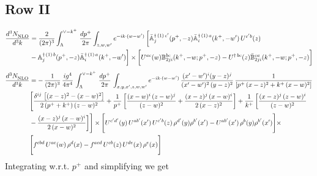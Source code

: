 \documentclass[9pt]{article}
\def\mf#1{\mathbb{#1}}
\numberwithin{equation}{section}
\begin{document}
\subsection{Row II\,}
\begin{align}
    \frac{d^{3}N_{\rm NLO}^{\rm}}{d^{3}k}  & =    \frac{2}{(2\pi)^{3}} \int_{\Lambda}^{\vee-k^{+}}\, \frac{dp^{+}}{2\pi}\int_{z,w,w^{\prime}} e^{-ik\cdot (w-w')}\,\bigg[\Bar{\mf{A}}^{\dagger\,(1)\, c^{\prime}}_{j}(p^{+},-z)\Bar{\mf{A}}^{\dagger\, (1)\, a}_{i}(k^{+},-w^{\prime})\,U^{c^{\prime}b}(z)\notag \\ & - \mf{A}^{\dagger\, (1)\, b}_{j}(p^{+},- z)\Bar{\mf{A}}^{\dagger\, (1)\, a}_{i}(k^{+},- w^{\prime})\bigg] \times  \bigg[U^{ac}(w) \mf{B}^{bc}_{2ji}(k^{+},-w;p^{+},-z) -U^{\dagger\, bc}(z)\Bar{\mf{B}}^{ca}_{2ji}(k^{+},-w; p^{+},-z)\bigg] \nonumber
\end{align} 
\begin{align}
    \frac{d^{3}N_{\rm NLO}^{\rm}}{d^{3}k}  & =  -\,\frac{1}{(2\pi)^{3}}\,\frac{ig^{4}}{4\pi^{4}}\,\int_{\Lambda}^{\vee-k^{+}}\,\frac{dp^{+}}{2\pi}\, \int_{x,y,x',z,w,w^{\prime}} e^{-ik\cdot (w-w')}\, \frac{(x'-w')^{i}(y-z)^{j}}{(x'-w')^{2}\,(y-z)^{2}}\, \frac{1}{\left[p^{+}\,(x-z)^{2}+k^{+}\,(x-w)^{2}\right]}\notag \\ & \Bigg[\frac{\delta^{ij}\, \left[(x-z)^{2}-(x-w)^{2}\right]}{2\, (p^{+}+k^{+})\,(z-w)^{2}}+\frac{1}{p^{+}}\, \bigg[\frac{(x-w)^{i}\,(z-w)^{j}}{(z-w)^{2}}+\frac{(x-z)^{j}\,(x-w)^{i}}{2\,(x-z)^{2}}\bigg]+\frac{1}{k^{+}}\,\bigg[\frac{(x-z)^{j}\,(z-w)^{i}}{(z-w)^{2}}\notag \\ & -\frac{(x-z)^{j}\,(x-w)^{i}}{2\,(x-w)^{2}}\bigg]\Bigg]\times \Bigg[U^{c'd'}(y)\,U^{ab'}(x')\,U^{c'b}(z)\,\rho^{d'}(y)\rho^{b'}(x')-U^{ab'}(x')\,\rho^{b}(y)\rho^{b'}(x')\Bigg]\times \notag \\ & \Bigg[f^{cbd}\,U^{ac}(w)\,\rho^{d}(x)-f^{acd}\, U^{cb}(z)\,U^{de}(x)\,\rho^{e}(x)\Bigg]
\end{align}
Integrating w.r.t. $p^{+}$ and simplifying we get
\end{document}
